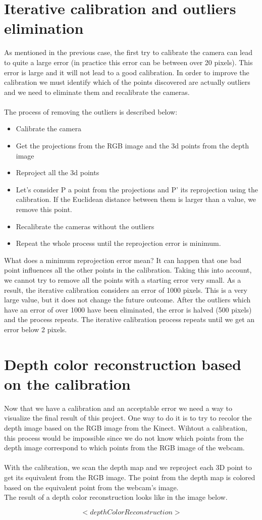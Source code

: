 \section{Iterative calibration and outliers elimination}
\noindent
As mentioned in the previous case, the first try to calibrate the camera can lead to quite a large error (in practice this error can be between over 20 pixels). This error is large and it will not lead to a good calibration. In order to improve the calibration we must identify which of the points discovered are actually outliers and we need to eliminate them and recalibrate the cameras. 
\\\\
The process of removing the outliers is described below:
\begin{itemize}
	\item Calibrate the camera
	\item Get the projections from the RGB image and the 3d points from the depth image
	\item Reproject all the 3d points
	\item Let's consider P a point from the projections and P' its reprojection using the calibration. If the Euclidean distance between them is larger than a value, we remove this point.
	\item Recalibrate the cameras without the outliers
	\item Repeat the whole process until the reprojection error is minimum.
\end{itemize}

\noindent
What does a minimum reprojection error mean? It can happen that one bad point influences all the other points in the calibration. Taking this into account, we cannot try to remove all the points with a starting error very small. As a result, the iterative calibration considers an error of 1000 pixels. This is a very large value, but it does not change the future outcome. After the outliers which have an error of over 1000 have been eliminated, the error is halved (500 pixels) and the process repeats. The iterative calibration process repeats until we get an error below 2 pixels. 

\section{Depth color reconstruction based on the calibration}
\noindent
Now that we have a calibration and an acceptable error we need a way to visualize the final result of this project. One way to do it is to try to recolor the depth image based on the RGB image from the Kinect. Wihtout a calibration, this process would be impossible since we do not know which points from the depth image correspond to which points from the RGB image of the webcam.
\\\\
With the calibration, we scan the depth map and we reproject each 3D point to get its equivalent from the RGB image. The point from the depth map is colored based on the equivalent point from the webcam's image. 
\\
The result of a depth color reconstruction looks like in the image below.

$$ <depthColorReconstruction> $$   
